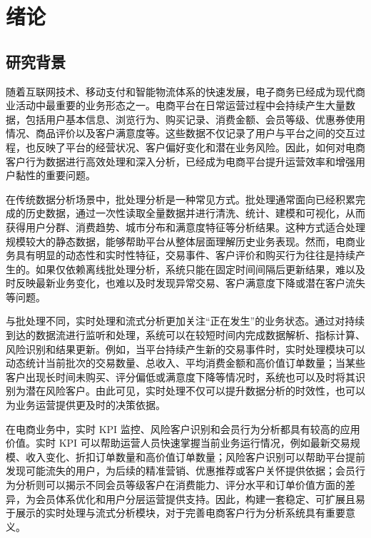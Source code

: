 \documentclass[12pt,hyperref,a4paper,UTF8]{ctexart}
\begin{document}
\thispagestyle{empty}

\newpage
\tableofcontents
\newpage

\section{绪论}

\subsection{研究背景}

随着互联网技术、移动支付和智能物流体系的快速发展，电子商务已经成为现代商业活动中最重要的业务形态之一。电商平台在日常运营过程中会持续产生大量数据，包括用户基本信息、浏览行为、购买记录、消费金额、会员等级、优惠券使用情况、商品评价以及客户满意度等。这些数据不仅记录了用户与平台之间的交互过程，也反映了平台的经营状况、客户偏好变化和潜在业务风险。因此，如何对电商客户行为数据进行高效处理和深入分析，已经成为电商平台提升运营效率和增强用户黏性的重要问题。

在传统数据分析场景中，批处理分析是一种常见方式。批处理通常面向已经积累完成的历史数据，通过一次性读取全量数据并进行清洗、统计、建模和可视化，从而获得用户分群、消费趋势、城市分布和满意度特征等分析结果。这种方式适合处理规模较大的静态数据，能够帮助平台从整体层面理解历史业务表现。然而，电商业务具有明显的动态性和实时性特征，交易事件、客户评价和购买行为往往是持续产生的。如果仅依赖离线批处理分析，系统只能在固定时间间隔后更新结果，难以及时反映最新业务变化，也难以及时发现异常交易、客户满意度下降或潜在客户流失等问题。

与批处理不同，实时处理和流式分析更加关注“正在发生”的业务状态。通过对持续到达的数据流进行监听和处理，系统可以在较短时间内完成数据解析、指标计算、风险识别和结果更新。例如，当平台持续产生新的交易事件时，实时处理模块可以动态统计当前批次的交易数量、总收入、平均消费金额和高价值订单数量；当某些客户出现长时间未购买、评分偏低或满意度下降等情况时，系统也可以及时将其识别为潜在风险客户。由此可见，实时处理不仅可以提升数据分析的时效性，也可以为业务运营提供更及时的决策依据。

在电商业务中，实时 KPI 监控、风险客户识别和会员行为分析都具有较高的应用价值。实时 KPI 可以帮助运营人员快速掌握当前业务运行情况，例如最新交易规模、收入变化、折扣订单数量和高价值订单数量；风险客户识别可以帮助平台提前发现可能流失的用户，为后续的精准营销、优惠推荐或客户关怀提供依据；会员行为分析则可以揭示不同会员等级客户在消费能力、评分水平和订单价值方面的差异，为会员体系优化和用户分层运营提供支持。因此，构建一套稳定、可扩展且易于展示的实时处理与流式分析模块，对于完善电商客户行为分析系统具有重要意义。
\end{document}
